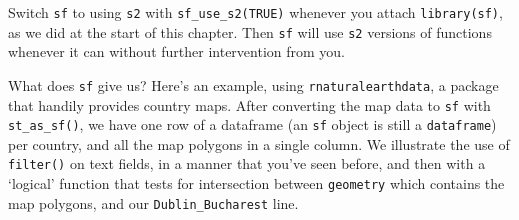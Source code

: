 \documentclass[
]{book}
\begin{document}
Switch \texttt{sf} to using \texttt{s2} with \texttt{sf\_use\_s2(TRUE)} whenever you attach \texttt{library(sf)}, as we did at the start of this chapter. Then \texttt{sf} will use \texttt{s2} versions of functions whenever it can without further intervention from you.

What does \texttt{sf} give us? Here's an example, using \texttt{rnaturalearthdata}, a package that handily provides country maps. After converting the map data to \texttt{sf} with \texttt{st\_as\_sf()}, we have one row of a dataframe (an \texttt{sf} object is still a \texttt{dataframe}) per country, and all the map polygons in a single column. We illustrate the use of \texttt{filter()} on text fields, in a manner that you've seen before, and then with a `logical' function that tests for intersection between \texttt{geometry} which contains the map polygons, and our \texttt{Dublin\_Bucharest} line.
\end{document}
